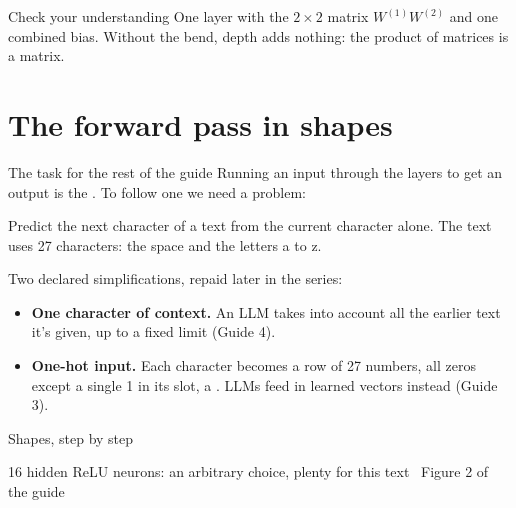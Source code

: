 \documentclass[aspectratio=169,11pt,t,\primeropts]{beamer}
\begin{document}
\begin{frame}{Check your understanding}
  {One layer with the $2 \times 2$ matrix $W^{(1)}W^{(2)}$ and one combined bias. Without the
    bend, depth adds nothing: the product of matrices is a matrix.}
\end{frame}

\section{The forward pass in shapes}

\begin{frame}{The task for the rest of the guide}
  Running an input through the layers to get an output is the . To follow
  one we need a problem:
  \begin{keyidea}[Task]
    Predict the next character of a text from the current character alone. The text uses 27
    characters: the space and the letters a to z.
  \end{keyidea}
  \vspace{2mm}
  Two declared simplifications, repaid later in the series:
  \begin{itemize}
    \item \textbf{One character of context.} An LLM takes into account all the earlier text it's
      given, up to a fixed limit (Guide 4).
    \item \textbf{One-hot input.} Each character becomes a row of 27 numbers, all zeros except a
      single 1 in its slot, a . LLMs feed in learned vectors instead
      (Guide 3).
  \end{itemize}
\end{frame}

\begin{frame}{Shapes, step by step}
  \vspace{-3mm}
  \vspace{-3mm}
  \begin{center}\footnotesize\color{primerMuted}
    16 hidden ReLU neurons: an arbitrary choice, plenty for this text \textperiodcentered\ Figure 2
    of the guide
  \end{center}
\end{frame}
\end{document}
